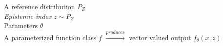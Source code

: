 \documentclass[preview]{standalone}
\begin{document}
A reference distribution  $P_Z$\\\textit{Epistemic index} $z \sim P_Z$\\Parameters $\theta$\\A parameterized function class $f$ $\xrightarrow{produces}$ vector valued output $f_\theta(x, z)$\\
\end{document}

